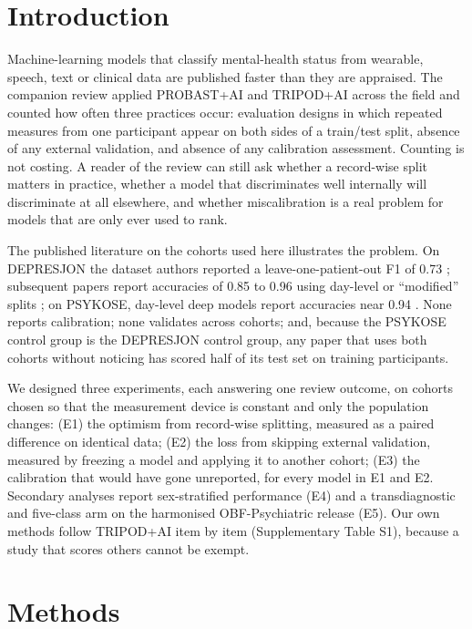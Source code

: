 \documentclass[11pt,a4paper]{article}
\begin{document}
\section{Introduction}
Machine-learning models that classify mental-health status from wearable, speech, text or clinical
data are published faster than they are appraised. The companion review \cite{paperA} applied
PROBAST+AI \cite{moons2025} and TRIPOD+AI \cite{collins2024} across the field and counted how
often three practices occur: evaluation designs in which repeated measures from one participant
appear on both sides of a train/test split, absence of any external validation, and absence of any
calibration assessment. Counting is not costing. A reader of the review can still ask whether a
record-wise split matters in practice, whether a model that discriminates well internally will
discriminate at all elsewhere, and whether miscalibration is a real problem for models that are
only ever used to rank.

The published literature on the cohorts used here illustrates the problem. On DEPRESJON the
dataset authors reported a leave-one-patient-out F1 of 0.73 \cite{garciaceja2018}; subsequent
papers report accuracies of 0.85 to 0.96 using day-level or ``modified'' splits
\cite{jmir2025,arxiv2303}; on PSYKOSE, day-level deep models report accuracies near 0.94
\cite{psykose_dl2024}. None reports calibration; none validates across cohorts; and, because the
PSYKOSE control group is the DEPRESJON control group, any paper that uses both cohorts without
noticing has scored half of its test set on training participants.

We designed three experiments, each answering one review outcome, on cohorts chosen so that the
measurement device is constant and only the population changes: (E1) the optimism from
record-wise splitting, measured as a paired difference on identical data; (E2) the loss from
skipping external validation, measured by freezing a model and applying it to another cohort;
(E3) the calibration that would have gone unreported, for every model in E1 and E2. Secondary
analyses report sex-stratified performance (E4) and a transdiagnostic and five-class arm on the
harmonised OBF-Psychiatric release (E5). Our own methods follow TRIPOD+AI item by item
(Supplementary Table S1), because a study that scores others cannot be exempt.

\section{Methods}
\end{document}
